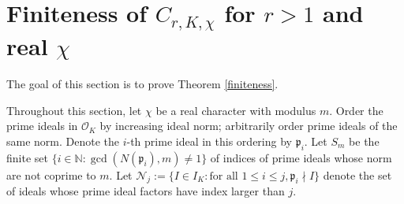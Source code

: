 \documentclass[12pt]{amsart}
\newtheorem{theorem}{Theorem}[section]
\theoremstyle{definition}
\newtheorem{definition}[theorem]{Definition}
\numberwithin{equation}{section}
\newcommand{\C}{\mathbb{C}}
\newcommand{\p}{\mathfrak{p}}
\newcommand{\Q}{\mathbb{Q}}
\newcommand{\Z}{\mathbb{Z}}
\newcommand{\N}{\mathbb{N}}
\begin{document}

\section{Finiteness of $C_{r,K,\chi}$ for $r > 1$ and real $\chi$} \label{section-finiteness}

The goal of this section is to prove Theorem \ref{finiteness}.

Throughout this section, let $\chi$ be a real character with modulus $m$. 
Order the prime ideals in $\mathcal{O}_K$ by increasing ideal norm; arbitrarily order prime ideals of the same norm. Denote the $i$-th prime ideal in this ordering by $\mathfrak{p}_i.$ 
Let $S_m$ be the finite set $\{i \in \N : \gcd(N(\p_i), m) \neq 1\}$ of indices of prime ideals whose norm are not coprime to $m$. Let $\mathcal{N}_j := \{ I \in I_K : \text{for all }1 \leq i \leq j, \p_i \nmid I\}$ denote the set of ideals whose prime ideal factors have index larger than $j$.
\end{document}

